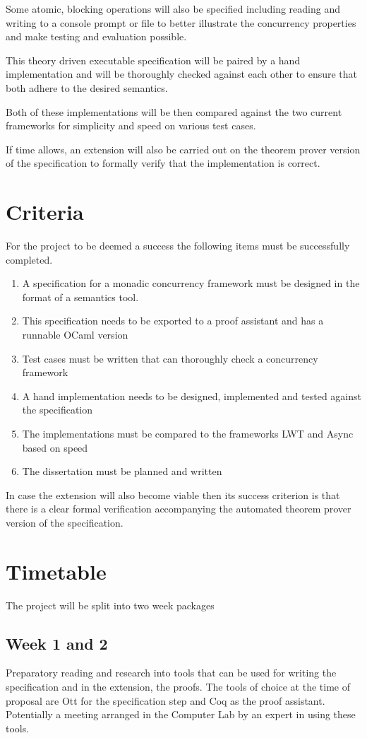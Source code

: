 Some atomic, blocking operations will also be specified including reading and writing to a console prompt or file to better illustrate the concurrency properties and make testing and evaluation possible.

This theory driven executable specification will be paired by a hand implementation and will be thoroughly checked against each other to ensure that both adhere to the desired semantics. 

Both of these implementations will be then compared against the two current frameworks for simplicity and speed on various test cases.

If time allows, an extension will also be carried out on the theorem prover version of the specification to formally verify that the implementation is correct. 
\section{Criteria}
For the project to be deemed a success the following items must be
successfully completed.
\begin{enumerate}
\item A specification for a monadic concurrency framework must be designed in the format of a semantics tool.
\item This specification needs to be exported to a proof assistant and has a runnable OCaml version
\item Test cases must be written that can thoroughly check a concurrency framework
\item A hand implementation needs to be designed, implemented and tested against the specification
\item The implementations must be compared to the frameworks LWT and Async based on speed
\item The dissertation must be planned and written
\end{enumerate}

In case the extension will also become viable then its success criterion is that there is a clear formal verification accompanying the automated theorem prover version of the specification.
\section{Timetable}
The project will be split into two week packages


\subsection{Week 1 and 2}
Preparatory reading and research into tools that can be used for writing the specification and in the extension, the proofs. The tools of choice at the time of proposal are Ott for the specification step and Coq\cite{Coq} as the proof assistant. Potentially a meeting arranged in the Computer Lab by an expert in using these tools. 

